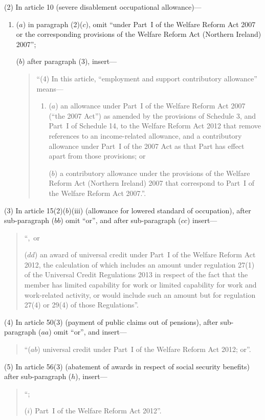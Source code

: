 \documentclass[12pt,a4paper]{article}
\begin{document}
(2) In article 10 (severe disablement occupational allowance)—
\begin{enumerate}\item[]
($a$) in paragraph (2)($c$), omit “under Part~I of the Welfare Reform Act 2007 or the corresponding provisions of the Welfare Reform Act (Northern Ireland) 2007”;

($b$) after paragraph (3), insert—
\begin{quotation}
“(4) In this article, “employment and support contributory allowance” means—
\begin{enumerate}\item[]
($a$) an allowance under Part~I of the Welfare Reform Act 2007 (“the 2007 Act”) as amended by the provisions of Schedule 3, and Part~I of Schedule 14, to the Welfare Reform Act 2012 that remove references to an income-related allowance, and a contributory allowance under Part~I of the 2007 Act as that Part has effect apart from those provisions; or

($b$) a contributory allowance under the provisions of the Welfare Reform Act (Northern Ireland) 2007 that correspond to Part~I of the Welfare Reform Act 2007.”.
\end{enumerate}
\end{quotation}
\end{enumerate}

(3) In article 15(2)($b$)(iii)  (allowance for lowered standard of occupation), after sub-paragraph ($bb$)  omit “or”, and after sub-paragraph ($cc$)  insert—
\begin{quotation}
“,~or

($dd$) an award of universal credit under Part~I of the Welfare Reform Act 2012, the calculation of which includes an amount under regulation 27(1) of the Universal Credit Regulations 2013 in respect of the fact that the member has limited capability for work or limited capability for work and work-related activity, or would include such an amount but for regulation 27(4) or 29(4) of those Regulations”.
\end{quotation}

(4) In article 50(3) (payment of public claims out of pensions), after sub-paragraph ($aa$)  omit “or”, and insert—
\begin{quotation}
“($ab$) universal credit under Part~I of the Welfare Reform Act 2012; or”.
\end{quotation}

(5) In article 56(3) (abatement of awards in respect of social security benefits) after sub-paragraph ($h$), insert—
\begin{quotation}
“;

($i$) Part~I of the Welfare Reform Act 2012”.
\end{quotation}
\end{document}
